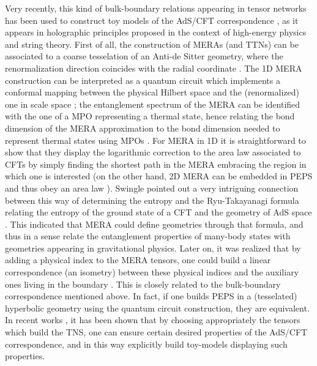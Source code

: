\documentclass[rmp,aps,reprint,superscriptaddress,nobalancelastpage]{revtex4-1}
\begin{document}
Very recently, this kind of bulk-boundary relations appearing in tensor
networks has been used to construct toy models of the AdS/CFT
correspondence \cite{maldacena:AdSCFT}, as it appears in holographic
principles proposed in the context of high-energy physics and string
theory. First of all, the construction of MERAs (and TTNs) can be
associated to a coarse tesselation of an Anti-de Sitter geometry, where
the renormalization direction coincides with the radial coordinate
\cite{swingle:mera-ads-cft, evenbly:tn-geometry}. The 1D  MERA
construction can be interpreted as a quantum circuit which implements a
conformal mapping between the physical Hilbert space and the
(renormalized) one in scale space \cite{czech2016tensor};  the
entanglement spectrum of the MERA can be identified with the one of a MPO
representing a thermal state, hence relating the bond dimension of the
MERA approximation to the bond dimension needed to represent thermal
states using MPOs \cite{van2020entanglement}. For MERA in 1D it is
straightforward to show that they display the logarithmic correction to
the area law associated to CFTs by simply finding the shortest path in the
MERA embracing the region in which one is interested \cite{vidal:mera} (on
the other hand, 2D MERA can be embedded in PEPS and thus obey an area law
\cite{barthel:peps-mera}). Swingle pointed out a very intriguing
connection between this way of determining the entropy and the
Ryu-Takayanagi formula relating the entropy of the ground state of a CFT
and the geometry of AdS space \cite{swingle:mera-ads-cft}. This indicated
that MERA could define geometries through that formula, and thus in a
sense relate the entanglement properties of many-body states with
geometries appearing in gravitational physics. Later on, it was realized
that by adding a physical index to the MERA tensors, one could build a
linear correspondence (an isometry) between these physical indices and the
auxiliary ones living in the boundary \cite{pastawski:holography}. This is
closely related to the bulk-boundary correspondence mentioned above. In
fact, if one builds PEPS in a (tesselated) hyperbolic geometry using the
quantum circuit construction, they are equivalent. In recent works
\cite{hayden:holographic-duality-from-tn,qi:holographic-coherent,qi:space-time-holographic,
    kohler:holographic-toy-models}, it has been shown that by choosing appropriately the tensors which build the TNS, one can ensure certain desired properties of the AdS/CFT correspondence, and in this way explicitly build toy-models displaying such properties.
\end{document}
